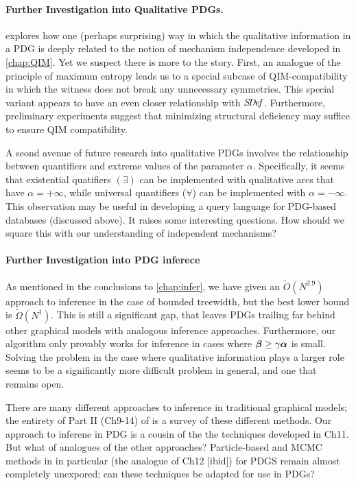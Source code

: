 \paragraph{Further Investigation into Qualitative PDGs.}
 explores how one (perhaps surprising) way in which the qualitative information in a PDG is deeply related to the notion of mechanism independence developed in \cref{chap:QIM}.
Yet we suspect there is more to the story. 
First, an analogue of the principle of maximum entropy 
    leads us to a special subcase of QIM-compatibility in which the witness does not break any unnecessary symmetries.
This special variant appears to have an even closer relationship with $\mathit{S\mskip-3.5muD\mskip-2.5mue\mskip-1.5muf}$.
Furthermore, preliminary experiments suggest that minimizing structural deficiency may suffice to ensure QIM compatibility. 

A seond avenue of future research into qualitative PDGs involves the relationship between quantifiers and extreme values of the parameter $\alpha$. 
Specifically, it seems that existential quatifiers $(\exists)$ can be implemented with qualitative arcs that have $\alpha = +\infty$, while universal quantifiers ($\forall$) can be implemented with $\alpha = -\infty$. 
This observation may be useful in developing a query language for PDG-based databases (discussed above).
It raises some interesting questions. 
How should we square this with our understanding of independent mechanisms?


\paragraph{Further Investigation into PDG inferece}
As mentioned in the conclusions to \cref{chap:infer}, we have given an $\tilde O(N^{2.9})$ approach to inference in the case of bounded treewidth, but the best lower bound is $\tilde \Omega( N^1)$. 
This is still a significant gap, that leaves PDGs trailing far behind other graphical models with analogous inference approaches.
Furthermore, our algorithm only provably works for inference in cases where $\boldsymbol\beta \ge \gamma\boldsymbol\alpha$ is small.
Solving the problem in the case where qualitative information plays a larger role seems to be a significantly more difficult problem in general, and one that remains open. 


There are many different approaches to inference in traditional graphical models;
the entirety of Part II (Ch9-14) of \citet{KF09} is a survey of these different methods.
Our approach to inferene in PDG is a cousin of the the techniques developed in Ch11. But what of analogues of the other approaches? 
Particle-based and MCMC methods in in particular (the analogue of Ch12 [ibid])
    for PDGS remain almost completely unexpored; can these techniques be adapted for use in PDGs?
    
